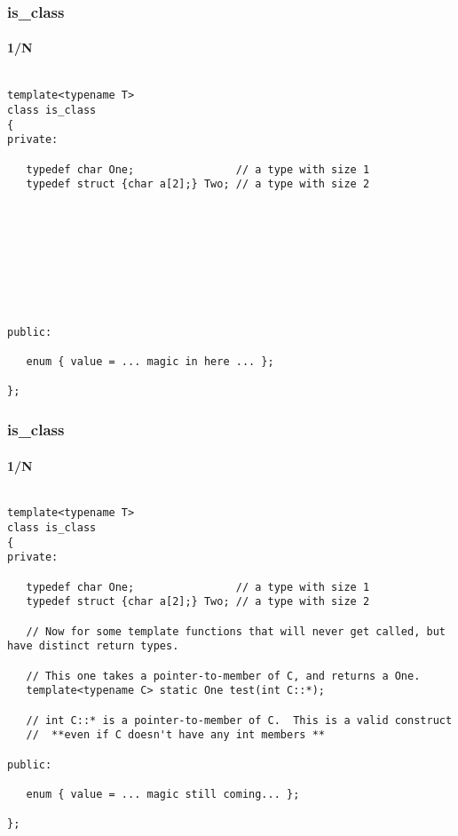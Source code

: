 \begin{frame}[fragile,t]
\frametitle{is\_class}
\framesubtitle{1/N}
{\scriptsize\begin{verbatim}

template<typename T>
class is_class
{
private:

   typedef char One;                // a type with size 1
   typedef struct {char a[2];} Two; // a type with size 2









public:

   enum { value = ... magic in here ... };

};

\end{verbatim}
}

\end{frame}


\begin{frame}[fragile,t]
\frametitle{is\_class}
\framesubtitle{1/N}
{\scriptsize\begin{verbatim}

template<typename T>
class is_class
{
private:

   typedef char One;                // a type with size 1
   typedef struct {char a[2];} Two; // a type with size 2

   // Now for some template functions that will never get called, but have distinct return types.

   // This one takes a pointer-to-member of C, and returns a One.
   template<typename C> static One test(int C::*);

   // int C::* is a pointer-to-member of C.  This is a valid construct
   //  **even if C doesn't have any int members **

public:

   enum { value = ... magic still coming... };

};

\end{verbatim}
}

\end{frame}

